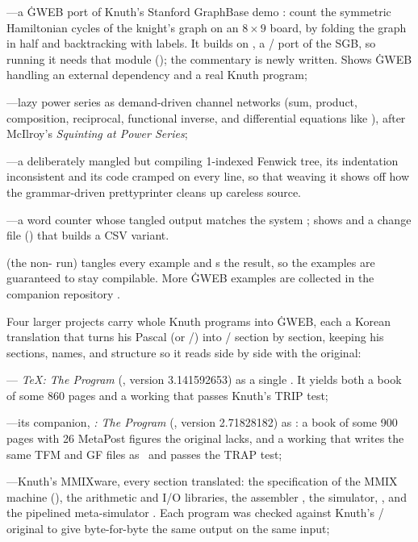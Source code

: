 \bull {}---a \.{GWEB} port of Knuth's Stanford GraphBase demo
: count the symmetric Hamiltonian cycles of the knight's graph on an
$8\times9$ board, by folding the graph in half and backtracking with 
labels. It builds on , a \GO/
port of the SGB, so running it needs that module (); the commentary is newly written. Shows \.{GWEB}
handling an external dependency and a real Knuth program;

\bull {}---lazy power series as demand-driven channel networks
(sum, product, composition, reciprocal, functional inverse, and differential
equations like ), after McIlroy's {\it Squinting at Power Series};

\bull {}---a deliberately mangled but compiling 1-indexed Fenwick
tree, its indentation inconsistent and its code cramped on every line, so that
weaving it shows off how the grammar-driven prettyprinter cleans up careless
source.

\bull {}---a word counter whose tangled output matches the system
; shows  and a change file () that builds a CSV
variant.

\noindent {} (the non- run) tangles every example and
s the result, so the examples are guaranteed to stay compilable.
More \.{GWEB} examples are collected in the companion repository
.

\noindent Four larger projects carry whole Knuth programs into \.{GWEB}, each a
Korean translation that turns his Pascal (or \CEE/) into \GO/ section by section,
keeping his sections, names, and structure so it reads side by side with the
original:

\bull {}---{\it
\TeX: The Program\/} (, version 3.141592653) as a single .
It yields both a book of some 860 pages and a working  that passes
Knuth's TRIP test;

\bull {}%
---its companion, {\slMF\it: The Program\/} (, version
2.71828182) as : a book of some 900 pages with 26 MetaPost figures the
original lacks, and a working  that writes the same TFM and GF files as
\MF\ and passes the TRAP test;

\bull {}---Knuth's MMIXware, every
section translated: the specification of the MMIX machine (), the
arithmetic and I/O libraries, the assembler , the simulator,
, and the pipelined meta-simulator . Each program was
checked against Knuth's \CEE/ original to give byte-for-byte the same output on
the same input;

